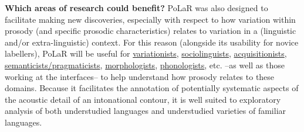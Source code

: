 \documentclass[11pt, twoside]{memoir}
\begin{document}
\textbf{Which areas of research could benefit?} PoLaR was also designed to facilitate making new discoveries, especially with respect to how variation within prosody (and specific prosodic characteristics) relates to variation in a (linguistic and/or extra-linguistic) context. For this reason (alongside its usability for novice labellers), PoLaR will be useful for \uline{variationists}, \uline{sociolinguists}, \uline{acquisitionists}, \uline{semanticists\slash pragmaticists}, \uline{morphologists}, \uline{phonologists}, etc. --as well as those working at the interfaces-- to help understand how prosody relates to these domains. Because it facilitates the annotation of potentially systematic aspects of the acoustic detail of an intonational contour, it is well suited to exploratory analysis of both understudied languages and understudied varieties of familiar languages.





\end{document}
